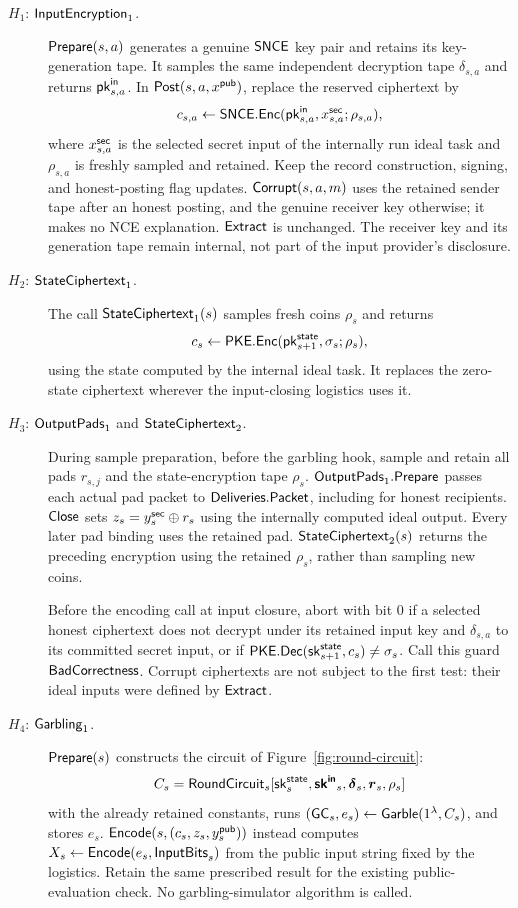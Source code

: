 \begin{description}
\item[$H_1$: $\mathsf{InputEncryption}_1$.]
 $\mathsf{Prepare}(s,a)$ generates a genuine $\mathsf{SNCE}$ key pair and retains its
 key-generation tape.  It samples the same independent decryption tape
 $\delta_{s,a}$ and returns $\mathsf{pk}^{\mathsf{in}}_{s,a}$.
 In $\mathsf{Post}(s,a,x^{\mathsf{pub}})$, replace the reserved ciphertext by
 \[
 c_{s,a}\gets\mathsf{SNCE}.\mathsf{Enc}(\mathsf{pk}^{\mathsf{in}}_{s,a},x^{\mathsf{sec}}_{s,a};\rho_{s,a}),
 \]
 where $x^{\mathsf{sec}}_{s,a}$ is the selected secret input of the internally run
 ideal task and $\rho_{s,a}$ is freshly sampled and retained.  Keep the
 record construction, signing, and honest-posting flag updates.
 $\mathsf{Corrupt}(s,a,m)$ uses the retained sender tape after an honest posting,
 and the genuine receiver key otherwise; it makes no NCE explanation.
 $\mathsf{Extract}$ is unchanged.  The receiver key and its generation tape
 remain internal, not part of the input provider's disclosure.

\item[$H_2$: $\mathsf{StateCiphertext}_1$.]
 The call $\mathsf{StateCiphertext}_1(s)$ samples fresh coins $\rho_s$ and returns
 \[
 c_s\gets\mathsf{PKE}.\mathsf{Enc}(\mathsf{pk}^{\mathsf{state}}_{s+1},\sigma_s;\rho_s),
 \]
 using the state computed by the internal ideal task.  It replaces the
 zero-state ciphertext wherever the input-closing logistics uses it.

\item[$H_3$: $\mathsf{OutputPads}_1$ and $\mathsf{StateCiphertext}_2$.]
 During sample preparation, before the garbling hook, sample and retain
 all pads $r_{s,j}$ and the state-encryption tape $\rho_s$.
 $\mathsf{OutputPads}_1.\mathsf{Prepare}$ passes each actual pad packet to
 $\mathsf{Deliveries}.\mathsf{Packet}$, including for honest recipients.
 $\mathsf{Close}$ sets $z_s=y^{\mathsf{sec}}_s\oplus r_s$ using the internally computed
 ideal output.  Every later pad binding uses the retained pad.
 $\mathsf{StateCiphertext}_2(s)$ returns the preceding encryption using the
 retained $\rho_s$, rather than sampling new coins.

 Before the encoding call at input closure, abort with bit $0$ if a
 selected honest ciphertext does not decrypt under its retained input
 key and $\delta_{s,a}$ to its committed secret input, or if
 $\mathsf{PKE}.\mathsf{Dec}(\mathsf{sk}^{\mathsf{state}}_{s+1},c_s)\ne\sigma_s$.
 Call this guard $\mathsf{BadCorrectness}$.  Corrupt ciphertexts are not subject
 to the first test: their ideal inputs were defined by $\mathsf{Extract}$.

\item[$H_4$: $\mathsf{Garbling}_1$.]
 $\mathsf{Prepare}(s)$ constructs the circuit of Figure~\ref{fig:round-circuit}:
 \[
 C_s=\mathsf{RoundCircuit}_s[\mathsf{sk}^{\mathsf{state}}_s,\boldsymbol{\mathsf{sk}^{\mathsf{in}}}_s,
                    \boldsymbol\delta_s,\boldsymbol r_s,\rho_s]
 \]
 with the already retained constants, runs
 $(\mathsf{GC}_s,e_s)\mathrel{\leftarrow}\mathsf{Garble}(1^\lambda,C_s)$, and stores $e_s$.
 $\mathsf{Encode}(s,(c_s,z_s,y^{\mathsf{pub}}_s))$ instead computes
 $X_s\gets\mathsf{Encode}(e_s,\mathsf{InputBits}_s)$ from the public input string fixed
 by the logistics.  Retain the same prescribed result for the existing
 public-evaluation check.  No garbling-simulator algorithm is called.


\end{description}
